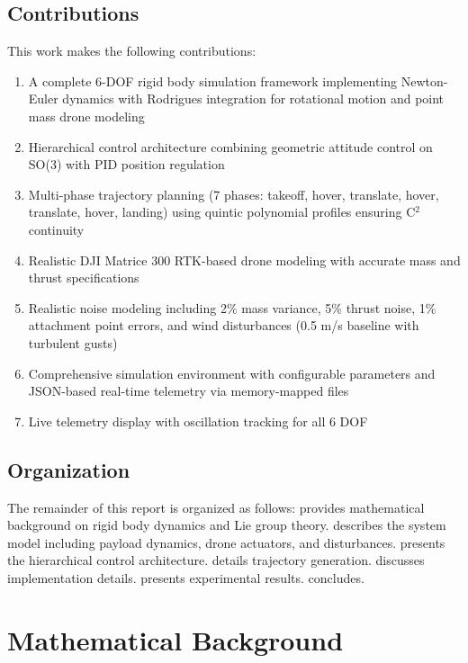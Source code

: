 \documentclass[12pt,a4paper]{article}
\begin{document}
\subsection{Contributions}
This work makes the following contributions:
\begin{enumerate}
    \item A complete 6-DOF rigid body simulation framework implementing Newton-Euler dynamics with Rodrigues integration for rotational motion and point mass drone modeling
    \item Hierarchical control architecture combining geometric attitude control on SO(3) with PID position regulation
    \item Multi-phase trajectory planning (7 phases: takeoff, hover, translate, hover, translate, hover, landing) using quintic polynomial profiles ensuring C$^2$ continuity
    \item Realistic DJI Matrice 300 RTK-based drone modeling with accurate mass and thrust specifications
    \item Realistic noise modeling including 2\% mass variance, 5\% thrust noise, 1\% attachment point errors, and wind disturbances (0.5 m/s baseline with turbulent gusts)
    \item Comprehensive simulation environment with configurable parameters and JSON-based real-time telemetry via memory-mapped files
    \item Live telemetry display with oscillation tracking for all 6 DOF
\end{enumerate}

\subsection{Organization}
The remainder of this report is organized as follows:  provides mathematical background on rigid body dynamics and Lie group theory.  describes the system model including payload dynamics, drone actuators, and disturbances.  presents the hierarchical control architecture.  details trajectory generation.  discusses implementation details.  presents experimental results.  concludes.

\section{Mathematical Background}
\label{sec:background}
\end{document}
